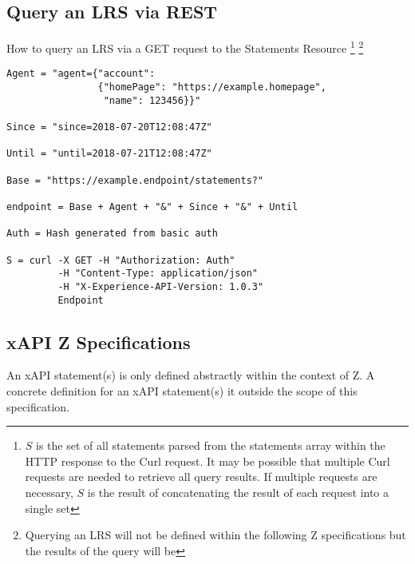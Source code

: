 \documentclass{article}
\begin{document}
  \subsection{Query an LRS via REST}
  How to query an LRS via a GET request to the Statements Resource
  \footnote{\label{moreLink} $S$ is the set of all statements parsed
    from the statements array within the HTTP response to the Curl
    request. It may be possible that multiple Curl requests are needed
    to retrieve all query results. If multiple requests are necessary,
    $S$ is the result of concatenating the result of each request into
    a single set}
  \footnote{\label{noZ} Querying an LRS will not be defined within the
  following Z specifications but the results of the query will be}

  \begin{lstlisting}[frame=single]
Agent = "agent={"account":
                {"homePage": "https://example.homepage",
                 "name": 123456}}"

Since = "since=2018-07-20T12:08:47Z"

Until = "until=2018-07-21T12:08:47Z"

Base = "https://example.endpoint/statements?"

endpoint = Base + Agent + "&" + Since + "&" + Until

Auth = Hash generated from basic auth

S = curl -X GET -H "Authorization: Auth"
         -H "Content-Type: application/json"
         -H "X-Experience-API-Version: 1.0.3"
         Endpoint
  \end{lstlisting}

  \subsection{xAPI Z Specifications}

  An xAPI statement(s) is only defined abstractly within the context
  of Z. A concrete definition for an xAPI statement(s) it outside the
  scope of this specification.
\end{document}

